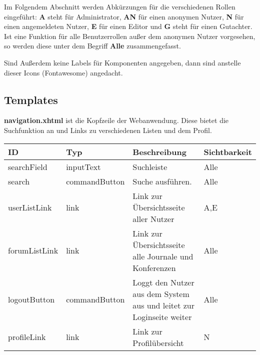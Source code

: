 \newcommand{\ftable}[1]{\begin{longtable}[H]{|m{2cm}|m{3cm}|m{6cm}|m{2.5cm}|}
                            \hline
                            \textbf{ID} & \textbf{Typ} & \textbf{Beschreibung} & \textbf{Sichtbarkeit} \\
                            \hline
                            \hline
                            #1
\end{longtable}
}

\newcommand{\fentry}[4]{#1 & #2 & #3 & #4 \\
\hline}



Im Folgendem Abschnitt werden Abkürzungen für die verschiedenen Rollen eingeführt:
\textbf{A} steht für Administrator, \textbf{AN} für einen anonymen Nutzer, \textbf{N} für einen angemeldeten Nutzer, \textbf{E} für einen Editor und \textbf{G} steht für einen Gutachter.
Ist eine Funktion für alle Benutzerrollen außer dem anonymen Nutzer vorgesehen, so werden diese unter dem Begriff \textbf{Alle} zusammengefasst.

Sind Außerdem keine Labels für Komponenten angegeben, dann sind anstelle dieser Icons (Fontawesome) angedacht.

\subsection{Templates}



\begin{samepage}
    \textbf{navigation.xhtml} ist die Kopfzeile der Webanwendung. Diese bietet die Suchfunktion an und Links zu verschiedenen Listen und dem Profil.
    \nopagebreak

    \ftable{
        \fentry{searchField}{inputText}{Suchleiste}{Alle}

        \fentry{search}{commandButton}{Suche ausführen.}{Alle}

        \fentry{userListLink}{link}{Link zur Übersichtsseite aller Nutzer}{A,E}

        \fentry{forumListLink}{link}{Link zur Übersichtsseite alle Journale und Konferenzen}{Alle}

        \fentry{logoutButton}{commandButton}{Loggt den Nutzer aus dem System aus und leitet zur Loginseite weiter}{Alle}

        \fentry{profileLink}{link}{Link zur Profilübersicht}{N}

    }
\end{samepage}

